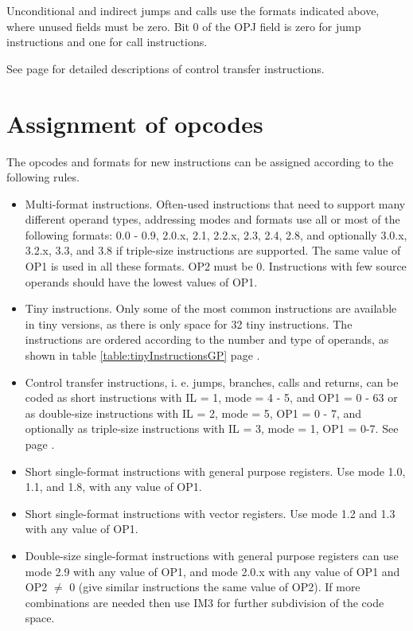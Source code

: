 \documentclass[forwardcom.tex]{subfiles}
\begin{document}
Unconditional and indirect jumps and calls use the formats indicated above, where unused fields must be zero. Bit 0 of the OPJ field is zero for jump instructions and one for call instructions.
\vspace{2mm}

See page \pageref{descriptionOfControlTransferInstructions} for 
detailed descriptions of control transfer instructions.


\section{Assignment of opcodes}
The opcodes and formats for new instructions can be assigned according to the following rules.

\begin{itemize}
\item Multi-format instructions. Often-used instructions that need to support many different operand types, addressing modes and formats use all or most of the following formats: 0.0 - 0.9, 2.0.x, 2.1, 2.2.x, 2.3, 2.4, 2.8, and optionally 3.0.x, 3.2.x, 3.3, and 3.8 if triple-size instructions are supported. The same value of OP1 is used in all these formats. OP2 must be 0. Instructions with few source operands should have the lowest values of OP1.

\item Tiny instructions. Only some of the most common instructions are available in tiny versions, as there is only space for 32 tiny instructions. The instructions are ordered according to the number and type of operands, as shown in table \ref{table:tinyInstructionsGP} page \pageref{table:tinyInstructionsGP}.

\item Control transfer instructions, i. e. jumps, branches, calls and returns, can be coded as short instructions with IL = 1, mode = 4 - 5, and OP1 = 0 - 63 or as double-size instructions with IL = 2, mode = 5, OP1 = 0 - 7, and optionally as triple-size instructions with IL = 3, mode = 1, OP1 = 0-7. See page \pageref{table:jumpInstructionFormats}.

\item Short single-format instructions with general purpose registers. Use mode 1.0, 1.1, and 1.8, with  any value of OP1.

\item Short single-format instructions with vector registers. Use mode 1.2 and 1.3
with any value of OP1.

\item Double-size single-format instructions with general purpose registers can use mode 2.9 with any value of OP1, and mode 2.0.x with any value of OP1 and OP2 $\neq$ 0 (give similar instructions the same value of OP2). If more combinations are needed then use IM3 for further subdivision of the code space.


\end{itemize}
\end{document}
